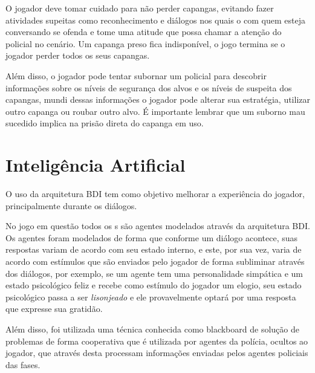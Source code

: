 O jogador deve tomar cuidado para não perder capangas, evitando fazer atividades supeitas como reconhecimento e diálogos nos quais o \npc{} com quem esteja conversando se ofenda e tome uma atitude que possa chamar a atenção do policial no cenário.
Um capanga preso fica indisponível, o jogo termina se o jogador perder todos os seus capangas.

Além disso, o jogador pode tentar subornar um policial para descobrir informações sobre os níveis de segurança dos alvos e os níveis de suspeita dos capangas, mundi dessas informações o jogador pode alterar sua estratégia, utilizar outro capanga ou roubar outro alvo. É importante lembrar que um suborno mau sucedido implica na prisão direta do capanga em uso.

\section{Inteligência Artificial}
O uso da arquitetura BDI tem como objetivo melhorar a experiência do jogador, principalmente durante os diálogos.

No jogo em questão todos os \npc{}s são agentes modelados através da arquitetura BDI. Os agentes foram modelados de forma que conforme um diálogo acontece, suas respostas variam de acordo com seu estado interno, e este, por sua vez, varia de acordo com estímulos que são enviados pelo jogador de forma subliminar através dos diálogos, por exemplo, se um agente tem uma personalidade simpática e um estado psicológico feliz e recebe como estímulo do jogador um elogio, seu estado psicológico passa a ser \emph{lisonjeado} e ele provavelmente optará por uma resposta que expresse sua gratidão.

Além disso, foi utilizada uma técnica conhecida como blackboard de solução de problemas de forma cooperativa que é utilizada por agentes da polícia, ocultos ao jogador, que através desta processam informações enviadas pelos agentes policiais das fases.

